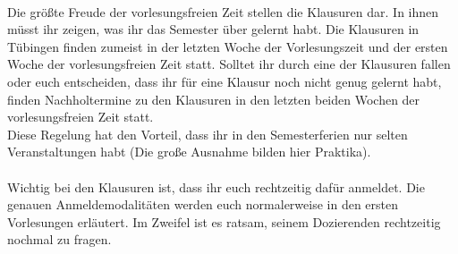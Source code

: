 \\
Die größte Freude der vorlesungsfreien Zeit stellen die Klausuren dar. In ihnen müsst ihr zeigen, was ihr das Semester über gelernt habt. Die Klausuren in Tübingen finden zumeist in der letzten Woche der Vorlesungszeit und der ersten Woche der vorlesungsfreien Zeit statt. Solltet ihr durch eine der Klausuren fallen oder euch entscheiden, dass ihr für eine Klausur noch nicht genug gelernt habt, finden Nachholtermine zu den Klausuren in den letzten beiden Wochen der vorlesungsfreien Zeit statt.\\
Diese Regelung hat den Vorteil, dass ihr in den Semesterferien nur selten Veranstaltungen habt (Die große Ausnahme bilden hier Praktika).\\
\\
Wichtig bei den Klausuren ist, dass ihr euch rechtzeitig dafür anmeldet. Die genauen Anmeldemodalitäten werden euch normalerweise in den ersten Vorlesungen erläutert. Im Zweifel ist es ratsam, seinem Dozierenden rechtzeitig nochmal zu fragen.
